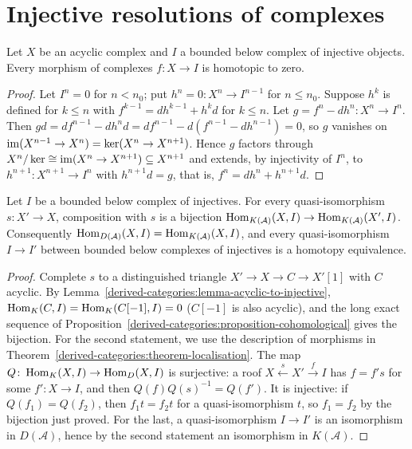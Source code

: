 \section{Injective resolutions of complexes}\label{derived-categories:section-injective-resolutions}

\begin{lemma}\label{derived-categories:lemma-acyclic-to-injective}
Let $X$ be an acyclic complex and $I$ a bounded below complex of injective objects. Every morphism of complexes $f \colon X \to I$ is
homotopic to zero.
\end{lemma}

\begin{proof}
Let $I^n = 0$ for $n < n_0$; put $h^n = 0 \colon X^n \to I^{n-1}$ for $n \leq n_0$. Suppose $h^k$ is defined for $k \leq n$ with
$f^{k-1} = dh^{k-1} + h^kd$ for $k \leq n$. Let $g = f^n - dh^n \colon X^n \to I^n$. Then
$gd = df^{n-1} - dh^nd = df^{n-1} - d(f^{n-1} - dh^{n-1}) = 0$, so $g$ vanishes on $\operatorname{im}(X^{n-1} \to X^n) = \ker(X^n \to X^{n+1})$. Hence $g$
factors through $X^n/\ker \cong \operatorname{im}(X^n \to X^{n+1}) \subseteq X^{n+1}$ and extends, by injectivity of $I^n$, to $h^{n+1} \colon X^{n+1} \to I^n$ with
$h^{n+1}d = g$, that is, $f^n = dh^n + h^{n+1}d$.
\end{proof}

\begin{corollary}\label{derived-categories:corollary-hom-injectives}
Let $I$ be a bounded below complex of injectives. For every quasi-isomorphism $s \colon X' \to X$, composition with $s$ is a bijection
$\operatorname{Hom}_{K(\mathcal{A})}(X, I) \to \operatorname{Hom}_{K(\mathcal{A})}(X', I)$. Consequently $\operatorname{Hom}_{D(\mathcal{A})}(X, I) = \operatorname{Hom}_{K(\mathcal{A})}(X, I)$, and every quasi-isomorphism
$I \to I'$ between bounded below complexes of injectives is a homotopy equivalence.
\end{corollary}

\begin{proof}
Complete $s$ to a distinguished triangle $X' \to X \to C \to X'[1]$ with $C$ acyclic. By Lemma~\ref{derived-categories:lemma-acyclic-to-injective},
$\operatorname{Hom}_K(C, I) = \operatorname{Hom}_K(C[-1], I) = 0$ ($C[-1]$ is also acyclic), and the long exact sequence of
Proposition~\ref{derived-categories:proposition-cohomological} gives the bijection. For the second statement, we use the description of morphisms in
Theorem~\ref{derived-categories:theorem-localisation}. The map $Q \colon \operatorname{Hom}_K(X, I) \to \operatorname{Hom}_D(X, I)$ is surjective: a roof
$X \xleftarrow{s} X' \xrightarrow{f} I$ has $f = f's$ for some $f' \colon X \to I$, and then $Q(f)Q(s)^{-1} = Q(f')$. It is injective: if $Q(f_1) = Q(f_2)$,
then $f_1t = f_2t$ for a quasi-isomorphism $t$, so $f_1 = f_2$ by the bijection just proved. For the last, a quasi-isomorphism $I \to I'$ is an isomorphism in
$D(\mathcal{A})$, hence by the second statement an isomorphism in $K(\mathcal{A})$.
\end{proof}

